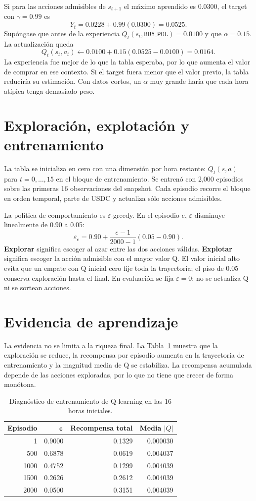\documentclass[12pt,letterpaper]{article}
\newcommand{\code}[1]{\texttt{#1}}
\begin{document}
Si para las acciones admisibles de $s_{t+1}$ el máximo aprendido es $0.0300$,
el target con $\gamma=0.99$ es
\[
Y_t=0.0228+0.99(0.0300)=0.0525.
\]
Supóngase que antes de la experiencia $Q_t(s_t,\code{BUY\_POL})=0.0100$ y que
$\alpha=0.15$. La actualización queda
\[
Q_t(s_t,a_t)\leftarrow0.0100+0.15(0.0525-0.0100)=0.0164.
\]
La experiencia fue mejor de lo que la tabla esperaba, por lo que aumenta el
valor de comprar en ese contexto. Si el target fuera menor que el valor previo,
la tabla reduciría su estimación. Con datos cortos, un $\alpha$ muy grande
haría que cada hora atípica tenga demasiado peso.

\section{Exploración, explotación y entrenamiento}

La tabla se inicializa en cero con una dimensión por hora restante:
$Q_t(s,a)$ para $t=0,\ldots,15$ en el bloque de entrenamiento. Se entrenó con
2,000 episodios sobre las primeras 16 observaciones del snapshot. Cada episodio
recorre el bloque en orden temporal, parte de USDC y actualiza sólo acciones
admisibles.

La política de comportamiento es $\varepsilon$-greedy. En el episodio $e$,
$\varepsilon$ disminuye linealmente de 0.90 a 0.05:
\[
\varepsilon_e=0.90+\frac{e-1}{2000-1}(0.05-0.90).
\]
\textbf{Explorar} significa escoger al azar entre las dos acciones válidas.
\textbf{Explotar} significa escoger la acción admisible con el mayor valor Q.
El valor inicial alto evita que un empate con Q inicial cero fije toda la
trayectoria; el piso de 0.05 conserva exploración hasta el final. En evaluación
se fija $\varepsilon=0$: no se actualiza Q ni se sortean acciones.

\section{Evidencia de aprendizaje}

La evidencia no se limita a la riqueza final. La Tabla~\ref{tab:evidencia}
muestra que la exploración se reduce, la recompensa por episodio aumenta en la
trayectoria de entrenamiento y la magnitud media de Q se estabiliza. La
recompensa acumulada depende de las acciones exploradas, por lo que no tiene que
crecer de forma monótona.

\begin{table}[h]
\centering
\caption{Diagnóstico de entrenamiento de Q-learning en las 16 horas iniciales.}
\label{tab:evidencia}
\begin{tabular}{rrrr}
\toprule
\textbf{Episodio} & $\boldsymbol{\varepsilon}$ & \textbf{Recompensa total} & \textbf{Media $|Q|$}\\
\midrule
1 & 0.9000 & 0.1329 & 0.000030\\
500 & 0.6878 & 0.0619 & 0.004037\\
1000 & 0.4752 & 0.1299 & 0.004039\\
1500 & 0.2626 & 0.2612 & 0.004039\\
2000 & 0.0500 & 0.3151 & 0.004039\\
\bottomrule
\end{tabular}
\end{table}
\end{document}
